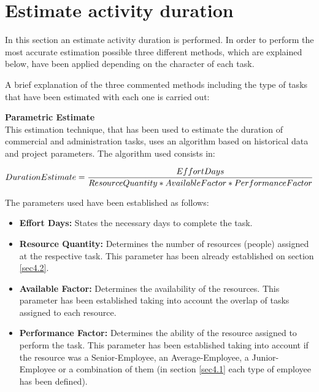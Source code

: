 \chapter{Estimate activity duration}

In this section an estimate activity duration is performed. In order to perform the most accurate estimation possible three different methods, which are explained below, have been applied depending on the character of each task. 

A brief explanation of the three commented methods including the type of tasks that have been estimated with each one is carried out:

\textbf{Parametric Estimate} \\
This estimation technique, that has been used to estimate the duration of commercial and administration tasks, uses an algorithm based on historical data and project parameters. The algorithm used consists in: 

\begin{equation}
\centering
\notag Duration Estimate=\frac{Effort Days}{Resource Quantity * Available Factor * Performance Factor}
\end{equation}

The parameters used have been established as follows:

\begin{itemize}
	
	\item \textbf{Effort Days:} States the necessary days to complete the task.
	
	\item \textbf{Resource Quantity:} Determines the number of resources (people) assigned at the respective task. This parameter has been already established on section \ref{sec4.2}.
	
	\item \textbf{Available Factor:} Determines the availability of the resources. This parameter has been established taking into account the overlap of tasks assigned to each resource.

	\item \textbf{Performance Factor:} Determines the ability of the resource assigned to perform the task. This parameter has been established taking into account if the resource was a Senior-Employee, an Average-Employee, a Junior-Employee or a combination of them (in section \ref{sec4.1} each type of employee has been defined).
	
\end{itemize}

